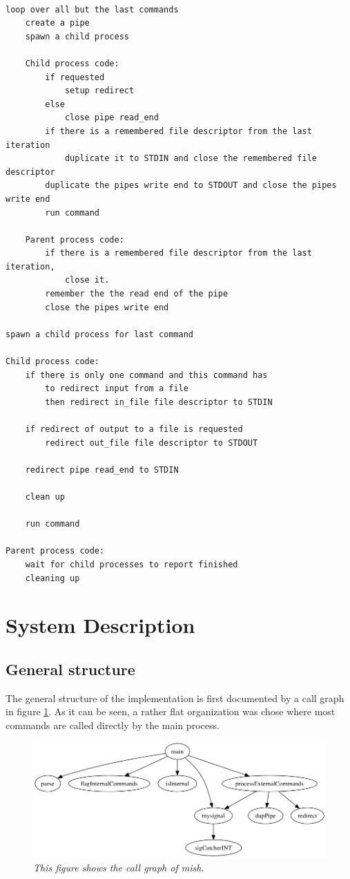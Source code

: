 \documentclass[a4paper,11pt,twoside]{article}
\begin{document}
\begin{verbatim}

loop over all but the last commands 
    create a pipe
    spawn a child process

    Child process code:
        if requested 
            setup redirect
        else
            close pipe read_end
        if there is a remembered file descriptor from the last iteration 
            duplicate it to STDIN and close the remembered file descriptor
        duplicate the pipes write end to STDOUT and close the pipes write end
        run command

    Parent process code:
        if there is a remembered file descriptor from the last iteration,
            close it.
        remember the the read end of the pipe 
        close the pipes write end

spawn a child process for last command

Child process code:
    if there is only one command and this command has 
        to redirect input from a file
        then redirect in_file file descriptor to STDIN

    if redirect of output to a file is requested
        redirect out_file file descriptor to STDOUT

    redirect pipe read_end to STDIN

    clean up

    run command

Parent process code:
    wait for child processes to report finished
    cleaning up
\end{verbatim}


\section{System Description}
\subsection{General structure}
The general structure of the implementation is first documented by a call graph in figure \ref{fig:callgraph}. As it can be seen, a rather flat organization was chose where most commands are called directly by the main process.
\begin{figure}
\centering
\includegraphics[width=\textwidth]{callgraph.png}
\caption{\textit{This figure shows the call graph of mish.}}
\label{fig:callgraph}
\end{figure}
\end{document}
